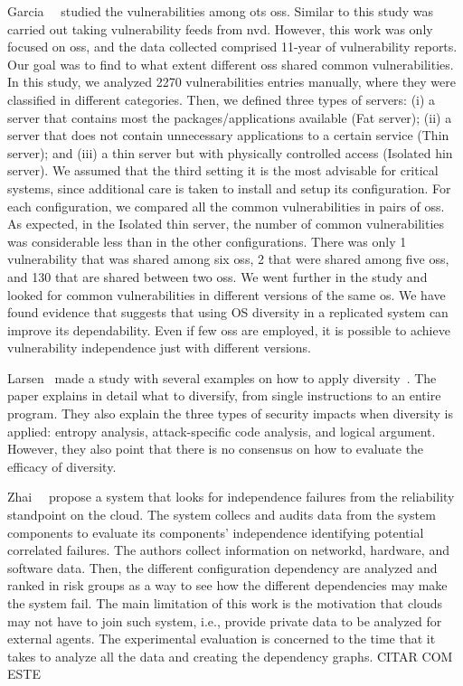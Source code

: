 Garcia~\etal{}~\cite{Garcia:2014} studied the vulnerabilities among \gls{ots} \glspl{os}. 
Similar to \cite{Han:2009} this study was carried out taking vulnerability feeds from \gls{nvd}. 
However, this work was only focused on \glspl{os}, and the data collected comprised 11-year of vulnerability reports. 
Our goal was to find to what extent different \glspl{os} shared common vulnerabilities. 
In this study, we analyzed 2270 vulnerabilities entries manually, where they were classified in different categories. 
Then, we defined three types of servers: (i) a server that contains most the packages/applications available (Fat server); (ii) a server that does not contain unnecessary applications to a certain
service (Thin server); and (iii) a thin server but with physically controlled access (Isolated hin server). 
We assumed that the third setting it is the most advisable for critical systems, since additional care is taken to install and setup its configuration. 
For each configuration, we compared all the common vulnerabilities in pairs of \glspl{os}. 
As expected, in the Isolated thin server, the number of common vulnerabilities was considerable less than in the other configurations. 
There was only 1 vulnerability that was shared among six \glspl{os}, 2 that were shared among five \glspl{os}, and 130 that are shared between two \glspl{os}. 
We went further in the study and looked for common vulnerabilities in different versions of the same \gls{os}. 
We have found evidence that suggests that using OS diversity in a replicated system can improve its dependability. 
Even if few \glspl{os} are employed, it is possible to achieve vulnerability independence just with different versions.


Larsen~\etal{} made a study with several examples on how to apply diversity~\cite{Larsen:2014,Larsen:2015}. 
The paper explains in detail what to diversify, from single instructions to an entire program. 
They also explain the three types of security impacts when diversity is applied: entropy analysis, attack-specific code analysis, and logical argument. 
However, they also point that there is no consensus on how to evaluate the efficacy of diversity. 


Zhai~\etal{}~\cite{Zhai:2014} propose a system that looks for independence failures from the reliability standpoint on the cloud.
The system collecs and audits data from the system components to evaluate its components' independence identifying potential correlated failures.
The authors collect information on networkd, hardware, and software data.
Then, the different configuration dependency are analyzed and ranked in risk groups as a way to see how the different dependencies may make the system fail.
The main limitation of this work is the motivation that clouds may not have to join such system, i.e., provide private data to be analyzed for external agents.
The experimental evaluation is concerned to the time that it takes to analyze all the data and creating the dependency graphs.
CITAR COM ESTE~\cite{George:2015}




